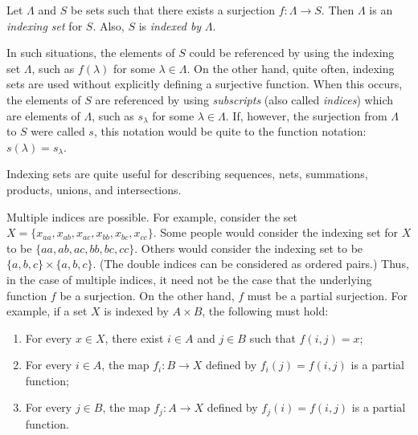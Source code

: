 \documentclass[12pt]{article}
\begin{document}
Let $\Lambda$ and $S$ be sets such that there exists a surjection $f \colon \Lambda \to S$.  Then $\Lambda$ is an \emph{indexing set} for $S$.  Also, $S$ is \emph{indexed by} $\Lambda$.

In such situations, the elements of $S$ could be referenced by using the indexing set $\Lambda$, such as $f(\lambda)$ for some $\lambda \in \Lambda$.  On the other hand, quite often, indexing sets are used without explicitly defining a surjective function.  When this occurs, the elements of $S$ are referenced by using \emph{subscripts} (also called \emph{indices}) which are elements of $\Lambda$, such as $s_{\lambda}$ for some $\lambda \in \Lambda$.  If, however, the surjection from $\Lambda$ to $S$ were called $s$, this notation would be quite  to the function notation: $s(\lambda)=s_{\lambda}$.

Indexing sets are quite useful for describing sequences, nets, summations, products, unions, and intersections.

Multiple indices are possible.  For example, consider the set $X=\{x_{aa},x_{ab},x_{ac},x_{bb},x_{bc},x_{cc}\}$.  Some people would consider the indexing set for $X$ to be $\{aa,ab,ac,bb,bc,cc\}$.  Others would consider the indexing set to be $\{a,b,c\} \times \{a,b,c\}$.  (The double indices can be considered as ordered pairs.)  Thus, in the case of multiple indices, it need not be the case that the underlying function $f$ be a surjection.  On the other hand, $f$ must be a partial surjection.  For example, if a set $X$ is indexed by $A \times B$, the following must hold:

\begin{enumerate}
\item For every $x\in X$, there exist $i\in A$ and $j\in B$ such that $f(i,j)=x$;
\item For every $i\in A$, the map $f_i \colon B \to X$ defined by $f_i(j)=f(i,j)$ is a partial function;
\item For every $j\in B$, the map $f_j \colon A \to X$ defined by $f_j(i)=f(i,j)$ is a partial function.
\end{enumerate}
\end{document}
